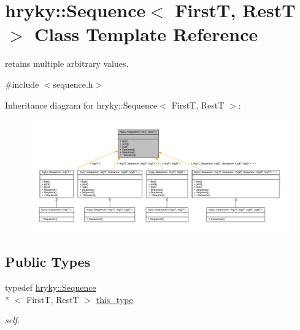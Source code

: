 \hypertarget{classhryky_1_1_sequence}{\section{hryky\-:\-:Sequence$<$ First\-T, Rest\-T $>$ Class Template Reference}
\label{classhryky_1_1_sequence}
}


retains multiple arbitrary values.  




{\ttfamily \#include $<$sequence.\-h$>$}



Inheritance diagram for hryky\-:\-:Sequence$<$ First\-T, Rest\-T $>$\-:\nopagebreak
\begin{figure}[H]
\begin{center}
\leavevmode
\includegraphics[width=350pt]{classhryky_1_1_sequence__inherit__graph}
\end{center}
\end{figure}
\subsection*{Public Types}
\begin{DoxyCompactItemize}
\item 
\hypertarget{classhryky_1_1_sequence_a704472ea381b81a30c2412c5a8d49074}{typedef \hyperlink{classhryky_1_1_sequence}{hryky\-::\-Sequence}\\*
$<$ First\-T, Rest\-T $>$ \hyperlink{classhryky_1_1_sequence_a704472ea381b81a30c2412c5a8d49074}{this\-\_\-type}}\label{classhryky_1_1_sequence_a704472ea381b81a30c2412c5a8d49074}

\begin{DoxyCompactList}\small\item\em self. \end{DoxyCompactList}\end{DoxyCompactItemize}
